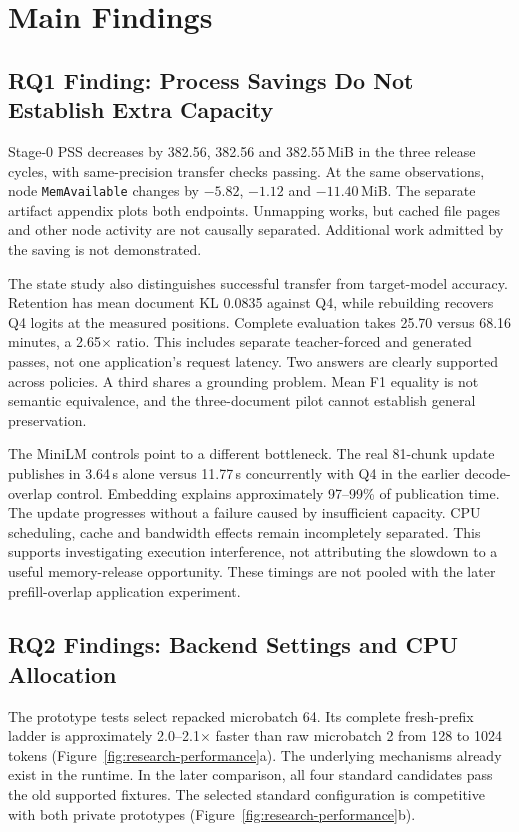 \section{Main Findings}
\label{sec:results}
\subsection{RQ1 Finding: Process Savings Do Not Establish Extra Capacity}
Stage-0 PSS decreases by 382.56, 382.56 and 382.55\,MiB in the three release
cycles, with same-precision transfer checks passing. At the same observations,
node \texttt{MemAvailable} changes by $-5.82$, $-1.12$ and $-11.40$\,MiB.
The separate artifact appendix plots both endpoints. Unmapping works, but cached
file pages and other node activity are not causally separated. Additional work
admitted by the saving is not demonstrated.


The state study also distinguishes successful transfer from target-model accuracy. Retention has
mean document KL 0.0835 against Q4, while rebuilding recovers Q4 logits at the
measured positions. Complete evaluation takes 25.70 versus 68.16 minutes, a
2.65$\times$ ratio. This includes separate teacher-forced and generated passes,
not one application's request latency. Two answers are clearly supported across
policies. A third shares a grounding problem. Mean F1 equality is not semantic
equivalence, and the three-document pilot cannot establish general preservation.

The MiniLM controls point to a different bottleneck. The real 81-chunk update
publishes in 3.64\,s alone versus 11.77\,s concurrently with Q4 in the earlier
decode-overlap control. Embedding explains approximately 97--99\% of publication
time. The update progresses without a failure caused by insufficient capacity. CPU scheduling,
cache and bandwidth effects remain incompletely separated. This supports
investigating execution interference, not attributing the slowdown to a useful
memory-release opportunity. These timings are not pooled with the later
prefill-overlap application experiment.

\subsection{RQ2 Findings: Backend Settings and CPU Allocation}
The prototype tests select repacked microbatch 64. Its complete
fresh-prefix ladder is approximately 2.0--2.1$\times$ faster than raw microbatch
2 from 128 to 1024 tokens (Figure~\ref{fig:research-performance}a). The underlying
mechanisms already exist in the runtime. In the later comparison, all four
standard candidates pass the old supported fixtures. The selected standard
configuration is competitive with both private prototypes
(Figure~\ref{fig:research-performance}b).


